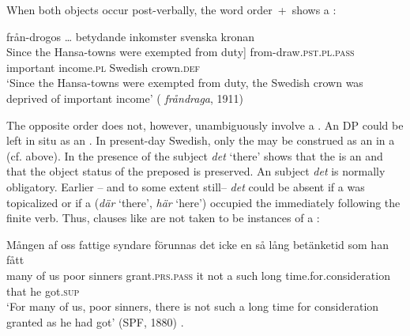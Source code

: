 \documentclass[output=paper]{langscibook}
\begin{document}
When both objects occur post-verbally, the word order \,+\, shows a :

\ea%
    \label{ex:falk:10}
    \gll {{\ob}Genom Hansestädernas tullfrihet]} {från-drogos …} betydande   inkomster  svenska    kronan \\
    {{\ob}Since the Hansa-towns were exempted from duty]}   from-draw\textsc{.pst.pl}.\textsc{pass}    important   income\textsc{.pl}  Swedish   crown.\textsc{def}\\
\glt ‘Since the Hansa-towns were exempted from duty, the Swedish crown was deprived of important income’ ( \textit{fråndraga}, 1911)
\z


The opposite order does not, however, unambiguously involve a . An  DP could be left in situ as an . In present-day Swedish, only the  may be construed as an  in a  (cf.  above). In  the presence of {the  subject \textit{det} ‘there’} shows that the  is an  and that the object status of the preposed  is preserved. An  subject \textit{det} is normally obligatory. Earlier – and to some extent still– \textit{det} could be absent if a  was topicalized or if a   (\textit{där} ‘there’, \textit{här} ‘here’) occupied the  immediately following the finite verb. Thus, clauses like  are not taken to be instances of a :

\ea%
    \label{ex:falk:11}
\ea\label{ex:falk:11a}
\gll Mången  af  oss  fattige  syndare  förunnas      det  icke  en  så    lång  betänketid            som  han  fått\\
many    of  us    poor    sinners    grant\textsc{.prs}.\textsc{pass}     it    not  a  such  long      time.for.consideration  that  he    got\textsc{.sup}\footnotemark{}\\
\glt ‘For many of us, poor sinners, there is not such a long time for consideration granted as he had got’ (SPF, 1880)
.
\end{document}
